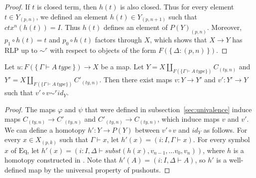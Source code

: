 \documentclass{mscs}
\newcommand{\Eq}{\mathrm{Eq}}
\numberwithin{figure}{section}
\begin{document}
\begin{proof}
If $t$ is closed term, then $h(t)$ is also closed.
Thus for every element $t \in Y_{(p,n)}$, we defined an element $h(t) \in Y_{(p,n+1)}$ such that $ctx^n(h(t)) = I$.
Thus $h(t)$ defines an element of $P(Y)_{(p,n)}$.
Moreover, $p_1 \circ h(t) = t$ and $p_0 \circ h(t)$ factors through $X$,
which shows that $X \to Y$ has RLP up to $\sim^r$ with respect to objects of the form $F(\{\,\Delta : (p,n)\,\})$.
\end{proof}

\begin{lem}[Jhom]
Let $u : F(\{\,\Gamma \vdash A\ type\,\}) \to X$ be a map.
Let $Y = X \amalg_{F(\{ \Gamma \vdash A\ type \})} C_{(ty,n)}$ and $Y' = X \amalg_{F(\{ \Gamma \vdash A\ type \})} C'_{(ty,n)}$.
Then there exist maps $v : Y \to Y'$ and $v' : Y' \to Y$ such that $v' \circ v \sim^r id_Y$.
\end{lem}
\begin{proof}
The maps $\varphi$ and $\psi$ that were defined in subsection~\ref{sec:univalence} induce maps $C_{(ty,n)} \to C'_{(ty,n)}$ and $C'_{(ty,n)} \to C_{(ty,n)}$, which induce maps $v$ and $v'$.
We can define a homotopy $h' : Y \to P(Y)$ between $v' \circ v$ and $id_Y$ as follows.
For every $x \in X_{(p,k)}$ such that $\Gamma \vdash x$, let $h'(x) = (i : I, \Gamma \vdash x)$.
For every symbol $x$ of $\Eq$, let $h'(x) = (i : I, \Delta \vdash subst(h(x), v_{n-1}, \ldots v_0, v_n))$, where $h$ is a homotopy constructed in .
Note that $h'(A) = (i : I, \Delta \vdash A)$, so $h'$ is a well-defined map by the universal property of pushouts.
\end{proof}
\end{document}
